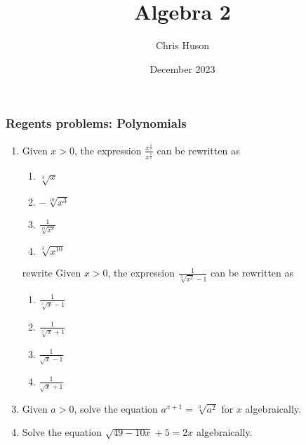 \documentclass[12pt, twoside]{article}
\title{Algebra 2}
\author{Chris Huson}
\date{December 2023}
\begin{document}
\subsubsection*{Regents problems: Polynomials}
\begin{enumerate}[itemsep=0.5cm]
\item Given $x > 0$, the expression $\displaystyle \frac{x^{\frac{1}{5}}}{x^{\frac{1}{2}}}$ can be rewritten as %
\begin{enumerate}
    \item $\sqrt[3]{x}$
    \item $-\sqrt[10]{x^3}$
    \item $\displaystyle \frac{1}{\sqrt[10]{x^3}}$
    \item $\sqrt[3]{x^{10}}$
\end{enumerate}

\item [rewrite] Given $x > 0$, the expression $\frac{1}{\sqrt[3]{x^2} - 1}$ can be rewritten as %
\begin{enumerate}
    \item $\frac{1}{\sqrt[3]{x} - 1}$
    \item $\frac{1}{\sqrt[3]{x} + 1}$
    \item $\frac{1}{\sqrt{x} - 1}$
    \item $\frac{1}{\sqrt{x} + 1}$
\end{enumerate}

\item Given $a > 0$, solve the equation $a^{x+1} = \sqrt[3]{a^2}$ for $x$ algebraically. %

\item Solve the equation $\sqrt{49-10x} +5 = 2x$ algebraically. %


\end{enumerate}
\end{document}

